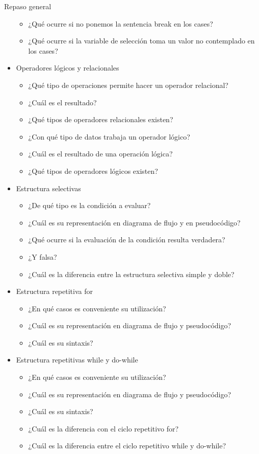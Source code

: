 \documentclass[xcolor=pdftex,table,11pt]{beamer}
\begin{document}
\begin{frame}[allowframebreaks]{Repaso general}
\begin{itemize}
\begin{itemize}
		\item  ¿Qué ocurre si no ponemos la sentencia break en los cases? 
		\item  ¿Qué ocurre si la variable de selección toma un valor no contemplado en los cases? 
		\end{itemize}
		
		\newpage
		\item Operadores lógicos y relacionales
		\begin{itemize}
		\item  ¿Qué tipo de operaciones permite hacer un operador relacional?
		\item  ¿Cuál es el resultado?
		\item   ¿Qué tipos de operadores relacionales existen?
		\item  ¿Con qué tipo de datos trabaja un operador lógico?
		\item  ¿Cuál es el resultado de una operación lógica?
		\item  ¿Qué tipos de operadores lógicos existen? 
	\end{itemize}
	
			\item Estructura selectivas
		\begin{itemize}
		\item  ¿De qué tipo es la condición a evaluar?
		\item ¿Cuál es su representación en diagrama de flujo y en pseudocódigo?
		\item  ¿Qué ocurre si la evaluación de la condición resulta verdadera?
		\item   ¿Y falsa?
		\item  ¿Cuál es la diferencia entre la estructura selectiva simple y doble?
	\end{itemize}
	\newpage
			\item Estructura repetitiva for
		\begin{itemize}
		\item  ¿En qué casos es conveniente su utilización?
	    \item  ¿Cuál es su representación en diagrama de flujo y pseudocódigo?
		\item  ¿Cuál es su sintaxis?
	\end{itemize}

			\item Estructura repetitivas while y do-while
		\begin{itemize}
		\item  ¿En qué casos es conveniente su utilización?
	    \item  ¿Cuál es su representación en diagrama de flujo y pseudocódigo?
		\item  ¿Cuál es su sintaxis?
		\item  ¿Cuál es la diferencia con el ciclo repetitivo for?
		\item  ¿Cuál es la diferencia entre el ciclo repetitivo while y do-while?
	\end{itemize}
	
\end{itemize}
\end{frame}
\end{document}
